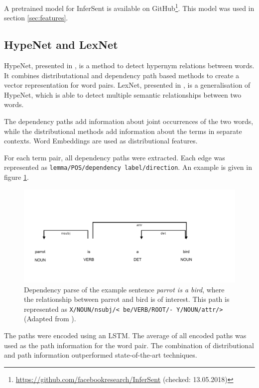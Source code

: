 A pretrained model for InferSent is available on GitHub\footnote{\url{https://github.com/facebookresearch/InferSent} (checked: 13.05.2018)}. This model was used in section \ref{sec:features}.

\subsection{HypeNet and LexNet}
\label{sec:lexnet}
HypeNet, presented in \cite{DBLP:conf/acl/ShwartzGD16}, is a method to detect hypernym relations between words. It combines distributational and dependency path based methods to create a vector representation for word pairs. LexNet, presented in \cite{DBLP:journals/corr/ShwartzD16}, is a generalisation of HypeNet, which is able to detect multiple semantic relationships between two words.

The dependency paths add information about joint occurrences of the two words, while the distributional methods add information about the terms in separate contexts. Word Embeddings are used as distributional features.

For each term pair, all dependency paths were extracted. Each edge was represented as \texttt{lemma/POS/dependency label/direction}. An example is given in figure \ref{fig:hypenet}. 

\begin{figure}[h]
\centering
\caption{Dependency parse of the example sentence \emph{parrot is a bird}, where the relationship between parrot and bird is of interest. This path is represented as \texttt{X/NOUN/nsubj/< be/VERB/ROOT/- Y/NOUN/attr/>} (Adapted from \cite{DBLP:conf/acl/ShwartzGD16}).}
\label{fig:hypenet}
\includegraphics{images/hypenet_example}
\end{figure}


The paths were encoded using an LSTM. The average of all encoded paths was used as the path information for the word pair. The combination of distributional and path information outperformed state-of-the-art techniques.\newline

